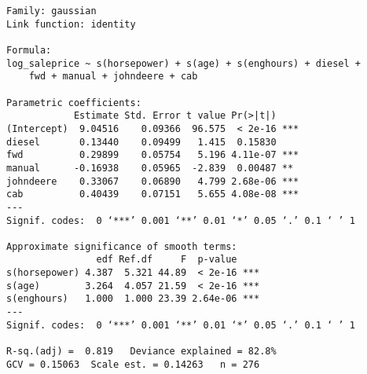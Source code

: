 \begin{verbatim}
Family: gaussian 
Link function: identity 

Formula:
log_saleprice ~ s(horsepower) + s(age) + s(enghours) + diesel + 
    fwd + manual + johndeere + cab

Parametric coefficients:
            Estimate Std. Error t value Pr(>|t|)    
(Intercept)  9.04516    0.09366  96.575  < 2e-16 ***
diesel       0.13440    0.09499   1.415  0.15830    
fwd          0.29899    0.05754   5.196 4.11e-07 ***
manual      -0.16938    0.05965  -2.839  0.00487 ** 
johndeere    0.33067    0.06890   4.799 2.68e-06 ***
cab          0.40439    0.07151   5.655 4.08e-08 ***
---
Signif. codes:  0 ‘***’ 0.001 ‘**’ 0.01 ‘*’ 0.05 ‘.’ 0.1 ‘ ’ 1

Approximate significance of smooth terms:
                edf Ref.df     F  p-value    
s(horsepower) 4.387  5.321 44.89  < 2e-16 ***
s(age)        3.264  4.057 21.59  < 2e-16 ***
s(enghours)   1.000  1.000 23.39 2.64e-06 ***
---
Signif. codes:  0 ‘***’ 0.001 ‘**’ 0.01 ‘*’ 0.05 ‘.’ 0.1 ‘ ’ 1

R-sq.(adj) =  0.819   Deviance explained = 82.8%
GCV = 0.15063  Scale est. = 0.14263   n = 276
\end{verbatim}